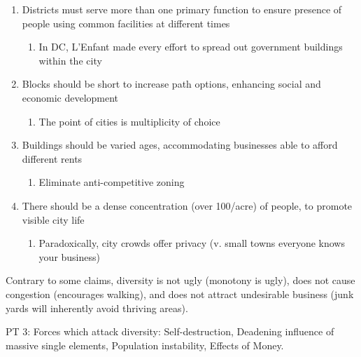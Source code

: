 \documentclass[
]{article}
\providecommand{\tightlist}{%
  \setlength{\itemsep}{0pt}\setlength{\parskip}{0pt}}
\begin{document}
\begin{enumerate}
\def\labelenumi{\arabic{enumi}.}
\item
  Districts must serve more than one primary function to ensure presence
  of people using common facilities at different times

  \begin{enumerate}
  \def\labelenumii{\arabic{enumii}.}
  \tightlist
  \item
    In DC, L'Enfant made every effort to spread out government buildings
    within the city
  \end{enumerate}
\item
  Blocks should be short to increase path options, enhancing social and
  economic development

  \begin{enumerate}
  \def\labelenumii{\arabic{enumii}.}
  \setcounter{enumii}{1}
  \tightlist
  \item
    The point of cities is multiplicity of choice
  \end{enumerate}
\item
  Buildings should be varied ages, accommodating businesses able to
  afford different rents

  \begin{enumerate}
  \def\labelenumii{\arabic{enumii}.}
  \setcounter{enumii}{2}
  \tightlist
  \item
    Eliminate anti-competitive zoning
  \end{enumerate}
\item
  There should be a dense concentration (over 100/acre) of people, to
  promote visible city life

  \begin{enumerate}
  \def\labelenumii{\arabic{enumii}.}
  \setcounter{enumii}{3}
  \tightlist
  \item
    Paradoxically, city crowds offer privacy (v. small towns everyone
    knows your business)
  \end{enumerate}
\end{enumerate}

Contrary to some claims, diversity is not ugly (monotony is ugly), does
not cause congestion (encourages walking), and does not attract
undesirable business (junk yards will inherently avoid thriving areas).

PT 3: Forces which attack diversity: Self-destruction, Deadening
influence of massive single elements, Population instability, Effects of
Money.
\end{document}
